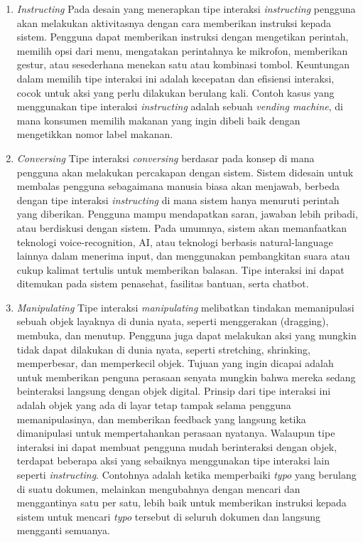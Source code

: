 \begin{enumerate}
  \item \textit{Instructing}
  \subitem Pada desain yang menerapkan tipe interaksi \textit{instructing} pengguna akan melakukan aktivitasnya dengan cara memberikan instruksi kepada sistem. Pengguna dapat memberikan instruksi dengan mengetikan perintah, memilih opsi dari menu, mengatakan perintahnya ke mikrofon, memberikan gestur, atau sesederhana menekan satu atau kombinasi tombol. Keuntungan dalam memilih tipe interaksi ini adalah kecepatan dan efisiensi interaksi, cocok untuk aksi yang perlu dilakukan berulang kali. Contoh kasus yang menggunakan tipe interaksi \textit{instructing} adalah sebuah \textit{vending machine}, di mana konsumen memilih makanan yang ingin dibeli baik dengan mengetikkan nomor label makanan.

  \item \textit{Conversing}
  \subitem Tipe interaksi \textit{conversing} berdasar pada konsep di mana pengguna akan melakukan percakapan dengan sistem. Sistem didesain untuk membalas pengguna sebagaimana manusia biasa akan menjawab, berbeda dengan tipe interaksi \textit{instructing} di mana sistem hanya menuruti perintah yang diberikan. Pengguna mampu mendapatkan saran, jawaban lebih pribadi, atau berdiskusi dengan sistem. Pada umumnya, sistem akan memanfaatkan teknologi voice-recognition, AI, atau teknologi berbasis natural-language lainnya dalam menerima input, dan menggunakan pembangkitan suara atau cukup kalimat tertulis untuk memberikan balasan. Tipe interaksi ini dapat ditemukan pada sistem penasehat, fasilitas bantuan, serta chatbot.
  
  \item \textit{Manipulating}
  \subitem Tipe interaksi \textit{manipulating} melibatkan tindakan memanipulasi sebuah objek layaknya di dunia nyata, seperti menggerakan (dragging), membuka, dan menutup. Pengguna juga dapat melakukan aksi yang mungkin tidak dapat dilakukan di dunia nyata, seperti stretching, shrinking, memperbesar, dan memperkecil objek. Tujuan yang ingin dicapai adalah untuk memberikan penguna perasaan senyata mungkin bahwa mereka sedang beinteraksi langsung dengan objek digital. Prinsip dari tipe interaksi ini adalah objek yang ada di layar tetap tampak selama pengguna memanipulasinya, dan memberikan feedback yang langsung ketika dimanipulasi untuk mempertahankan perasaan nyatanya. Walaupun tipe interaksi ini dapat membuat pengguna mudah berinteraksi dengan objek, terdapat beberapa aksi yang sebaiknya menggunakan tipe interaksi lain seperti \textit{instructing}. Contohnya adalah ketika memperbaiki \textit{typo} yang berulang di suatu dokumen, melainkan mengubahnya dengan mencari dan menggantinya satu per satu, lebih baik untuk memberikan instruksi kepada sistem untuk mencari \textit{typo} tersebut di seluruh dokumen dan langsung mengganti semuanya.
  

\end{enumerate}
